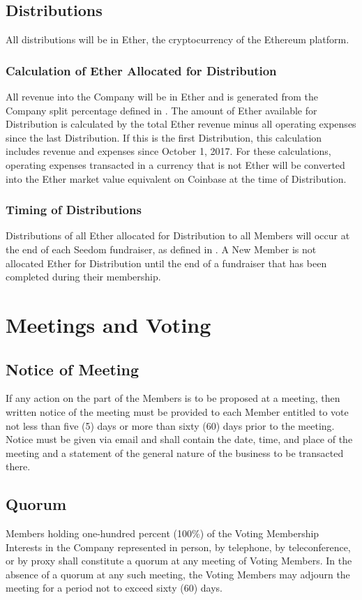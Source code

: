 \documentclass[11pt]{article}
\begin{document}
\subsection{Distributions}
All distributions will be in Ether, the cryptocurrency of the Ethereum platform.

\subsubsection{Calculation of Ether Allocated for Distribution}
All revenue into the Company will be in Ether and is generated from the Company split percentage defined in . The amount of Ether available for Distribution is calculated by the total Ether revenue minus all operating expenses since the last Distribution. If this is the first Distribution, this calculation includes revenue and expenses since October 1, 2017. For these calculations, operating expenses transacted in a currency that is not Ether will be converted into the Ether market value equivalent on Coinbase at the time of Distribution.

\subsubsection{Timing of Distributions}
Distributions of all Ether allocated for Distribution to all Members will occur at the end of each Seedom fundraiser, as defined in . A New Member is not allocated Ether for Distribution until the end of a fundraiser that has been completed during their membership.

\section{Meetings and Voting}

\subsection{Notice of Meeting}
If any action on the part of the Members is to be proposed at a meeting, then written notice of the meeting must be provided to each Member entitled to vote not less than five (5) days or more than sixty (60) days prior to the meeting. Notice must be given via email and shall contain the date, time, and place of the meeting and a statement of the general nature of the business to be transacted there.

\subsection{Quorum}
Members holding one-hundred percent (100\%) of the Voting Membership Interests in the Company represented in person, by telephone, by teleconference, or by proxy shall constitute a quorum at any meeting of Voting Members. In the absence of a quorum at any such meeting, the Voting Members may adjourn the meeting for a period not to exceed sixty (60) days.
\end{document}
